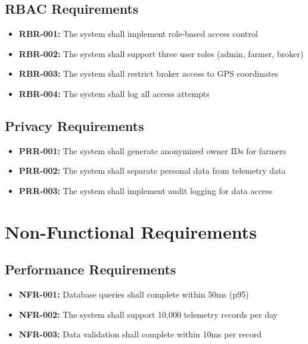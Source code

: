 \subsection{RBAC Requirements}

\begin{itemize}
    \item \textbf{RBR-001:} The system shall implement role-based access control
    \item \textbf{RBR-002:} The system shall support three user roles (admin, farmer, broker)
    \item \textbf{RBR-003:} The system shall restrict broker access to GPS coordinates
    \item \textbf{RBR-004:} The system shall log all access attempts
\end{itemize}

\subsection{Privacy Requirements}

\begin{itemize}
    \item \textbf{PRR-001:} The system shall generate anonymized owner IDs for farmers
    \item \textbf{PRR-002:} The system shall separate personal data from telemetry data
    \item \textbf{PRR-003:} The system shall implement audit logging for data access
\end{itemize}

\section{Non-Functional Requirements}

\subsection{Performance Requirements}

\begin{itemize}
    \item \textbf{NFR-001:} Database queries shall complete within 50ms (p95)
    \item \textbf{NFR-002:} The system shall support 10,000 telemetry records per day
    \item \textbf{NFR-003:} Data validation shall complete within 10ms per record
\end{itemize}

